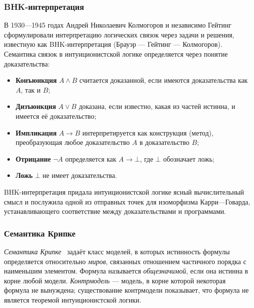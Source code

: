 \documentclass[14pt, russian]{scrartcl}
\begin{document}
\subsubsection{BHK-интерпретация}
В 1930---1945 годах Андрей Николаевич Колмогоров и независимо
Гейтинг~\cite{Heyting1956}
сформулировали интерпретацию логических связок через задачи и решения,
известную как BHK-интерпретация (Брауэр --- Гейтинг --- Колмогоров). Семантика
связок в интуиционистской логике определяется через понятие доказательства:
\begin{itemize}
    \item \textbf{Конъюнкция} \( A \land B \) считается доказанной, если
      имеются доказательства как \( A \), так и \( B \);
    \item \textbf{Дизъюнкция} \( A \lor B \) доказана, если известно, какая из
      частей истинна, и имеется её доказательство;
    \item \textbf{Импликация} \( A \rightarrow B \) интерпретируется как
      конструкция (метод), преобразующая любое доказательство \( A \) в
      доказательство \( B \);
    \item \textbf{Отрицание} \( \neg A \) определяется как \( A \rightarrow
      \bot \), где \( \bot \) обозначает ложь;
    \item \textbf{Ложь} \( \bot \) не имеет доказательства.
\end{itemize}
BHK-интерпретация придала интуиционистской логике ясный вычислительный смысл и
послужила одной из отправных точек для изоморфизма Карри---Говарда,
устанавливающего соответствие между доказательствами и программами.

\subsubsection{Семантика Крипке}
\emph{Семантика Крипке}~\cite{Kripke1965} задаёт класс моделей, в которых истинность формулы
определяется относительно \emph{миров}, связанных отношением частичного порядка с наименьшим элементом.
Формула называется \emph{общезначимой}, если она истинна в корне любой модели.
\emph{Контрмодель} --- модель, в корне которой некоторая формула не вынуждена;
существование контрмодели показывает, что формула не является теоремой
интуиционистской логики.
\end{document}
